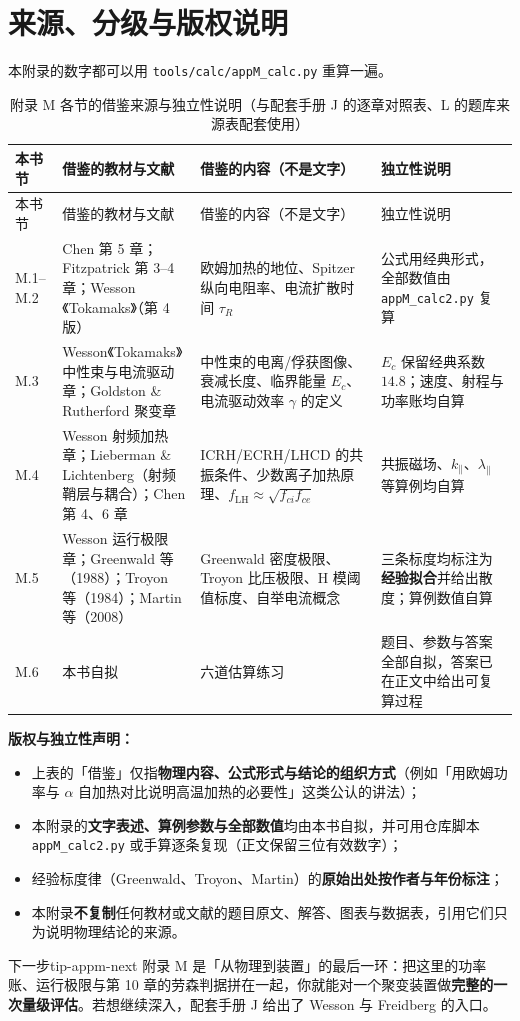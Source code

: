 \section{来源、分级与版权说明}

\begingroup\small
本附录的数字都可以用 \texttt{tools/\allowbreak{}calc/\allowbreak{}appM\_calc.py} 重算一遍。
\label{sec:app-m-source}

{\small
\begin{longtable}{@{}p{1.5cm}p{5.2cm}p{5.3cm}p{3.6cm}@{}}
\caption{附录 M 各节的借鉴来源与独立性说明（与配套手册 J 的逐章对照表、L 的题库来源表配套使用）}\label{tab:app-m-source}\\
\toprule
本书节 & 借鉴的教材与文献 & 借鉴的内容（不是文字） & 独立性说明 \\
\midrule
\endfirsthead
\toprule
本书节 & 借鉴的教材与文献 & 借鉴的内容（不是文字） & 独立性说明 \\
\midrule
\endhead
\bottomrule
\endlastfoot
M.1--M.2 & Chen 第 5 章；Fitzpatrick 第 3--4 章；Wesson《Tokamaks》（第 4 版） & 欧姆加热的地位、Spitzer 纵向电阻率、电流扩散时间 $\tau_R$ & 公式用经典形式，全部数值由 \texttt{appM\_{}calc2.py} 复算 \\
M.3 & Wesson《Tokamaks》中性束与电流驱动章；Goldston \& Rutherford 聚变章 & 中性束的电离/俘获图像、衰减长度、临界能量 $E_c$、电流驱动效率 $\gamma$ 的定义 & $E_c$ 保留经典系数 $14.8$；速度、射程与功率账均自算 \\
M.4 & Wesson 射频加热章；Lieberman \& Lichtenberg（射频鞘层与耦合）；Chen 第 4、6 章 & ICRH/ECRH/LHCD 的共振条件、少数离子加热原理、$f_{\mathrm{LH}}\approx\sqrt{f_{ci}f_{ce}}$ & 共振磁场、$k_\parallel$、$\lambda_\parallel$ 等算例均自算 \\
M.5 & Wesson 运行极限章；Greenwald 等（1988）；Troyon 等（1984）；Martin 等（2008） & Greenwald 密度极限、Troyon 比压极限、H 模阈值标度、自举电流概念 & 三条标度均标注为\textbf{经验拟合}并给出散度；算例数值自算 \\
M.6 & 本书自拟 & 六道估算练习 & 题目、参数与答案全部自拟，答案已在正文中给出可复算过程 \\
\end{longtable}
}

\textbf{版权与独立性声明：}
\begin{itemize}
\item 上表的「借鉴」仅指\textbf{物理内容、公式形式与结论的组织方式}（例如「用欧姆功率与 $\alpha$ 自加热对比说明高温加热的必要性」这类公认的讲法）；
\item 本附录的\textbf{文字表述、算例参数与全部数值}均由本书自拟，并可用仓库脚本 \texttt{appM\_{}calc2.py} 或手算逐条复现（正文保留三位有效数字）；
\item 经验标度律（Greenwald、Troyon、Martin）的\textbf{原始出处按作者与年份标注}；
\item 本附录\textbf{不复制}任何教材或文献的题目原文、解答、图表与数据表，引用它们只为说明物理结论的来源。
\end{itemize}

\begin{tip}{下一步}{tip-appm-next}
附录 M 是「从物理到装置」的最后一环：把这里的功率账、运行极限与第 10 章的劳森判据拼在一起，你就能对一个聚变装置做\textbf{完整的一次量级评估}。若想继续深入，配套手册 J 给出了 Wesson 与 Freidberg 的入口。
\end{tip}
\endgroup
